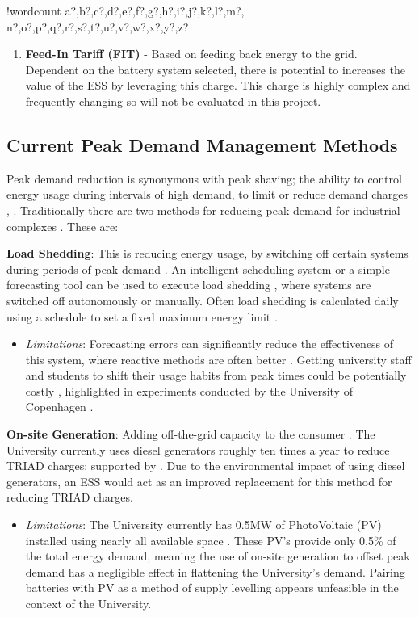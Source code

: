 \documentclass[fontsize=9.5pt]{extarticle}
\numberwithin{figure}{section} %
\providecommand{\tightlist}{%
  \setlength{\itemsep}{0pt}\setlength{\parskip}{0pt}}
\newcounter{words}
\newenvironment{counted}{%
  \setcounter{words}{0}
  \SearchList!{wordcount}{\stepcounter{words}}
    {a?,b?,c?,d?,e?,f?,g?,h?,i?,j?,k?,l?,m?,
    n?,o?,p?,q?,r?,s?,t?,u?,v?,w?,x?,y?,z?}
  \UndoBoundary{'}
  \SearchOrder{p;}}{%
  \StopSearching}
\begin{document}
\begin{counted}
\begin{enumerate}
\item \textbf{Feed-In Tariff (FIT)} - Based on feeding back energy to the grid. Dependent on the battery system selected, there is potential to increases the value of the ESS by leveraging this charge. This charge is highly complex and frequently changing so will not be evaluated in this project.
\end{enumerate}

\subsection{Current Peak Demand Management
Methods}\label{current-peak-demand-management-methods}

Peak demand reduction is synonymous with peak shaving; the ability to
control energy usage during intervals of high demand, to limit or reduce
demand charges \cite{schneiderRECPS}, \cite{baldorPS}. Traditionally
there are two methods for reducing peak demand for industrial complexes
\cite{schneiderRECPS}. These are:

\textbf{Load Shedding}: This is reducing energy usage, by switching off
certain systems during periods of peak demand \cite{6199851}. An
intelligent scheduling system or a simple forecasting tool can be used
to execute load shedding \cite{Reducing37:online}, where systems are
switched off autonomously or manually. Often load shedding is calculated
daily using a schedule to set a fixed maximum energy limit
\cite{6938948}.

\begin{itemize}
\tightlist
\item
  \emph{Limitations}: Forecasting errors can significantly reduce the
  effectiveness of this system, where reactive methods are often better
  \cite{6938948}. Getting university staff and students to shift their
  usage habits from peak times could be potentially costly
  \cite{Jbrentmeet}, highlighted in experiments conducted by the
  University of Copenhagen \cite{copenmeet}.
\end{itemize}

\textbf{On-site Generation}: Adding off-the-grid capacity to the
consumer \cite{schneiderRECPS}. The University currently uses diesel
generators roughly ten times a year to reduce TRIAD charges; supported
by \cite{shen2016}. Due to the environmental impact of using diesel
generators, an ESS would act as an improved replacement for this method
for reducing TRIAD charges.

\begin{itemize}
\tightlist
\item
  \emph{Limitations}: The University currently has 0.5MW of PhotoVoltaic
  (PV) installed using nearly all available space \cite{Jbrentmeet}.
  These PV's provide only 0.5\% of the total energy demand, meaning the
  use of on-site generation to offset peak demand has a negligible
  effect in flattening the University's demand. Pairing batteries with
  PV as a method of supply levelling appears unfeasible in the context
  of the University.
\end{itemize}


\end{counted}
\end{document}
